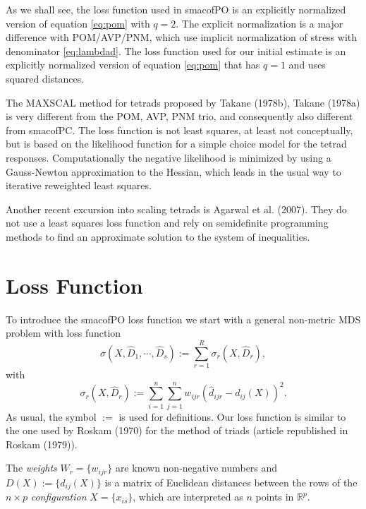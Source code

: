 \documentclass[
  12pt,
]{article}
\begin{document}
As we shall see, the loss function used in smacofPO is an explicitly normalized version of equation \eqref{eq:pom} with \(q=2\). The explicit normalization is a major difference with POM/AVP/PNM, which use implicit normalization of stress with denominator \eqref{eq:lambdad}. The loss function used for our initial estimate is an explicitly normalized version of equation \eqref{eq:pom} that has \(q=1\) and uses squared distances.

The MAXSCAL method for tetrads proposed by Takane (1978b), Takane (1978a) is very different from the POM, AVP, PNM trio, and consequently also different from smacofPC. The loss function is not
least squares, at least not conceptually, but is based on the likelihood function for a simple choice model for the tetrad responses. Computationally the negative likelihood is minimized by using a Gauss-Newton approximation to the Hessian, which leads in the usual way to iterative reweighted least squares.

Another recent excursion into scaling tetrads is Agarwal et al. (2007). They do not use
a least squares loss function and rely on semidefinite programming methods
to find an approximate solution to the system of inequalities.

\section{Loss Function}\label{loss-function}

To introduce the smacofPO loss function we start with a general non-metric MDS problem with
loss function
\begin{equation}
\sigma(X,\hat D_1,\cdots,\hat D_s):=\sum_{r=1}^R\sigma_r(X,\hat D_r),
\label{eq:stressdef}
\end{equation}
with
\begin{equation}
\sigma_r(X,\hat D_r):=\sum_{i=1}^n\sum_{j=1}^n w_{ijr}(\hat d_{ijr}-d_{ij}(X))^2.
\label{eq:rstressdef}
\end{equation}
As usual, the symbol \(:=\) is used for definitions. Our loss function is
similar to the one used by Roskam (1970) for the method of triads (article republished in Roskam (1979)).

The \emph{weights} \(W_r=\{w_{ijr}\}\) are known non-negative
numbers and \(D(X):=\{d_{ij}(X)\}\) is a matrix of Euclidean distances
between the rows of the \(n\times p\) \emph{configuration} \(X=\{x_{is}\}\), which are interpreted as \(n\) points in \(\mathbb{R}^p\).
\end{document}
